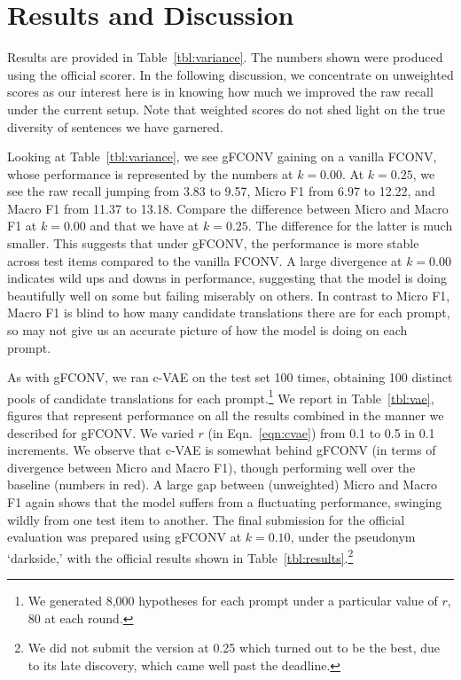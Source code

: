 \documentclass[dvipdfmx,11pt,a4paper]{article}
\begin{document}
 \section{Results and Discussion \label{sec:results}}
%
\par Results are provided in Table~\ref{tbl:variance}.  The numbers shown were produced  using the official scorer.  In the following discussion, we concentrate on unweighted scores as our interest here is in knowing how much we improved the raw recall under the current setup. Note that weighted scores do not shed light on the true diversity of sentences we have garnered.
\par Looking at Table~\ref{tbl:variance}, we see  gFCONV gaining on  a vanilla FCONV, whose performance is represented by  the numbers at $k=0.00$.    At $k=0.25$, we see the raw recall jumping from 3.83 to 9.57, Micro F1 from 6.97 to 12.22, and Macro F1 from 11.37 to 13.18. Compare the difference between Micro and Macro F1 at $k=0.00$ and that we have at $k=0.25$. The difference for the latter is much smaller. This suggests that under  gFCONV, the performance is more stable across  test items compared to the vanilla FCONV.  A large divergence at $k=0.00$ indicates wild ups and downs  in performance, suggesting that the model is doing beautifully well on some but failing miserably on others. In contrast to Micro F1, Macro F1 is blind to how many candidate translations  there are for each prompt, so may not give us an accurate picture of how the model is doing on each prompt.
%
\par  As with gFCONV,  we ran c-VAE on the test set 100 times, obtaining 100 distinct pools of candidate translations for each prompt.\footnote{
We generated 8,000 hypotheses for  each prompt under a particular value of  $r$, 80 at each round. 
} We report  in Table~\ref{tbl:vae}, figures that represent performance on all the results combined in the manner we described for gFCONV.  %
We varied $r$ (in Eqn.~\ref{eqn:cvae}) from 0.1 to 0.5 in 0.1 increments. We observe that c-VAE is somewhat behind gFCONV (in terms of divergence between Micro and Macro F1), though performing well over the baseline (numbers in red). A large gap between (unweighted) Micro and Macro F1 again shows that the model suffers from a fluctuating  performance, swinging wildly from one test item to another.  
The final submission for the official evaluation was prepared using gFCONV at $k=0.10$, under the pseudonym `darkside,' with the official results shown in Table~\ref{tbl:results}.\footnote{We did not submit the version at 0.25 which turned out to be the best, due to  its late discovery, which came well past the deadline.  }
\end{document}
